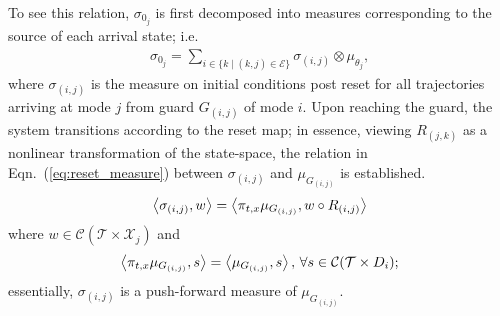 \par
To see this relation, $\sigma_{0_j}$ is first decomposed into measures corresponding to the source of each arrival state; i.e.
\begin{align}
  \sigma_{0_j}=\sum_{i\in \{k\mid (k,j)\in \mathcal E\}} \sigma_{(i,j)}\otimes \mu_{\theta_j},
\end{align}
where $\sigma_{(i,j)}$ is the measure on initial conditions post reset for all trajectories arriving at mode $j$ from guard $ G_{(i,j)}$ of mode $i$. Upon reaching the guard, the system transitions according to the reset map; in essence, viewing $R_{(j,k)}$ as a nonlinear transformation of the state-space, the relation in Eqn.~(\ref{eq:reset_measure}) between $\sigma_{(i,j)}$ and $\mu_{ G_{(i,j)}}$ is established.
\begin{align}
    \left\langle \sigma_{(i,j)},w\right\rangle=\left\langle \pi_{t,x}\mu_{ G_{(i,j)}},w\circ R_{(i,j)}\right\rangle
    \label{eq:reset_measure}
\end{align}
where $w\in \mathcal C(\mathcal T\times \mathcal X_j)$ and
$$
  \left\langle \pi_{t,x}\mu_{ G_{(i,j)}},s\right\rangle=\left\langle \mu_{ G_{(i,j)}},s\right\rangle,\,\forall s\in \mathcal C(\mathcal T\times D_i);
$$
essentially, $\sigma_{(i,j)}$ is a push-forward measure of $\mu_{ G_{(i,j)}}$.
